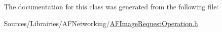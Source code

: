 The documentation for this class was generated from the following file\-:\begin{DoxyCompactItemize}
\item 
Sources/\-Librairies/\-A\-F\-Networking/\hyperlink{_a_f_image_request_operation_8h}{A\-F\-Image\-Request\-Operation.\-h}\end{DoxyCompactItemize}
